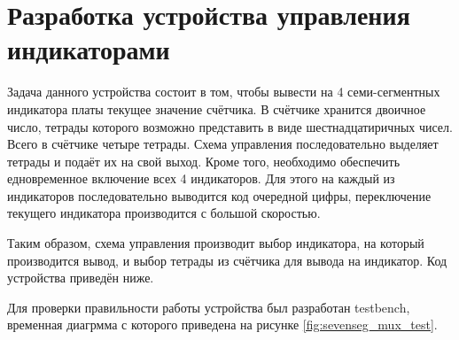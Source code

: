 \documentclass[a4paper, 14pt]{extarticle}
\begin{document}
    \section{Разработка устройства управления индикаторами}
    Задача данного устройства состоит в том, чтобы вывести на 4 семи-сегментных индикатора платы текущее значение счётчика.
    В счётчике хранится двоичное число, тетрады которого возможно представить в виде шестнадцатиричных чисел. Всего в счётчике четыре тетрады. Схема управления последовательно выделяет тетрады и подаёт их на свой выход.
    Кроме того, необходимо обеспечить едновременное включение всех 4 индикаторов. Для этого на каждый из индикаторов последовательно выводится код очередной цифры, переключение текущего индикатора производится с большой скоростью.
    
    Таким образом, схема управления производит выбор индикатора, на который производится вывод, и выбор тетрады из счётчика для вывода на индикатор. Код устройства приведён ниже.

    Для проверки правильности работы устройства был разработан testbench, временная диагрмма с которого приведена на рисунке \ref{fig:sevenseg_mux_test}.
\end{document}
